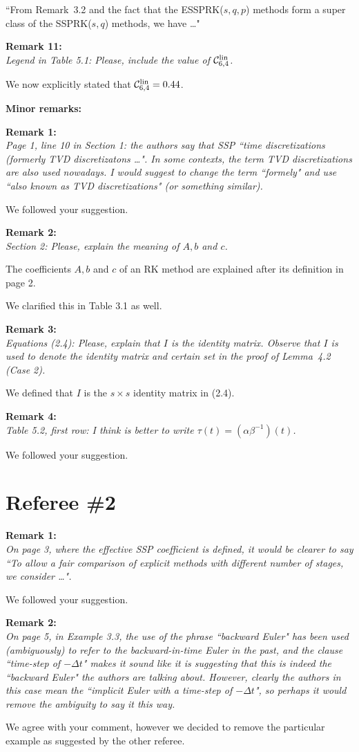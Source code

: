 \documentclass[12pt]{article}
\newcommand{\remark}[2]{\vspace{25pt} \noindent \textbf{Remark #1:\newline} \textit{#2}\vspace{15pt}}
\renewcommand{\newline}{\vspace{15pt}\\}
\newcommand{\sspcoef}{\mathcal{C}}
\begin{document}
``From Remark~3.2 and the fact that the ESSPRK($s,q,p$) methods 
form a super class of the SSPRK($s,q$) methods, we have \dots"

\remark{11}{
Legend in Table 5.1: Please, include the value of $\sspcoef^{\textnormal{lin}}_{6,4}$.}

We now explicitly stated that $\sspcoef^{\textnormal{lin}}_{6,4}=0.44$.
\vspace{40pt}

\pagebreak

\noindent \textbf{\large Minor remarks:}

\remark{1}{
Page 1, line 10 in Section 1: the authors say that SSP ``time discretizations (formerly
TVD discretizatons \dots". 
In some contexts, the term TVD discretizations are also used nowadays. 
I would suggest to change the term ``formely" and use ``also known as TVD discretizations" 
(or something similar).}

We followed your suggestion.

\remark{2}{
Section 2: Please, explain the meaning of $A, b$ and $c$.}

The coefficients $A, b$ and $c$ of an RK method are explained after its definition in page 2.

We clarified this in Table 3.1 as well.

\remark{3}{
Equations (2.4): Please, explain that $I$ is the identity matrix. Observe that $I$ is used to
denote the identity matrix and certain set in the proof of Lemma~4.2 (Case 2).}

We defined that $I$ is the $s \times s$ identity matrix in (2.4).

\remark{4}{
Table 5.2, first row: I think is better to write $\tau(t) = (\alpha\beta^{-1})(t)$.}

We followed your suggestion.

\vspace{50pt}

\section*{Referee \#2}
\remark{1}{
On page 3, where the effective SSP coefficient is defined, it would be clearer to say
``To allow a fair comparison of explicit methods with different number of stages, we consider \dots". }

We followed your suggestion.

\remark{2}{
On page 5, in Example 3.3, the use of the phrase ``backward Euler" has been used 
(ambiguously) to refer to the backward-in-time Euler in the past, and the clause 
``time-step of $-\Delta t$" makes it sound like it is suggesting that this is indeed 
the ``backward Euler" the authors are talking about. 
However, clearly the authors in this case mean the ``implicit Euler with a time-step 
of $-\Delta t$", so perhaps it would remove the ambiguity to say it this way.}

We agree with your comment, however we decided to remove the particular example 
as suggested by the other referee.
\end{document}
